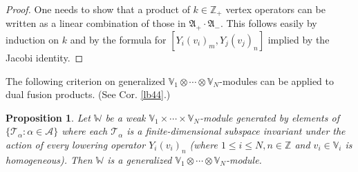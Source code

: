 \documentclass[11pt,b5paper,notitlepage]{article}
\theoremstyle{definition}
\theoremstyle{plain}
\newtheorem{pp}[df]{Proposition}
\newcommand{\fk}{\mathfrak}
\newcommand{\mc}{\mathcal}
\newcommand{\Vbb}{\mathbb V}
\newcommand{\Wbb}{\mathbb W}
\newcommand{\Zbb}{\mathbb Z}
\newcommand{\<}{\left\langle}
\renewcommand{\>}{\right\rangle}
\numberwithin{equation}{section}
\begin{document}
\begin{proof}
One needs to show that a product of $k\in\Zbb_+$ vertex operators can be written as a linear combination of those in $\fk A_+\cdot\fk A_-$. This follows easily by induction on $k$ and by the formula for $[Y_i(v_i)_m,Y_j(v_j)_n]$ implied by the Jacobi identity.
\end{proof}

The following criterion on generalized $\Vbb_1\otimes\cdots\otimes\Vbb_N$-modules can be applied to dual fusion products. (See Cor. \ref{lb44}.)   %


\begin{pp}\label{lb42}
Let $\Wbb$ be a weak $\Vbb_1\times\cdots\times\Vbb_N$-module generated by elements of $\{\mc T_\alpha:\alpha\in\mc A\}$ where each $\mc T_\alpha$ is a finite-dimensional subspace invariant under the action of every lowering operator $Y_i(v_i)_n$ (where $1\leq i\leq N,n\in\Zbb$ and $v_i\in\Vbb_i$ is homogeneous). Then $\Wbb$ is a generalized $\Vbb_1\otimes\cdots\otimes\Vbb_N$-module.
\end{pp}
\end{document}
